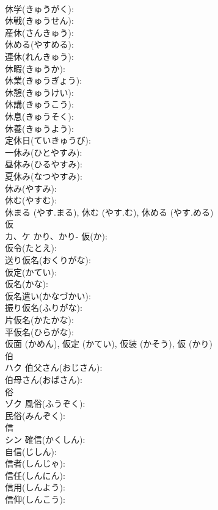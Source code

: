 \documentclass[8pt]{extreport}
\begin{document}
\begin{CJK}{UTF8}{min}
\\	休学(きゅうがく): 
\\	休戦(きゅうせん): 
\\	産休(さんきゅう): 
\\	休める(やすめる): 
\\	連休(れんきゅう): 
\\	休暇(きゅうか): 
\\	休業(きゅうぎょう): 
\\	休憩(きゅうけい): 
\\	休講(きゅうこう): 
\\	休息(きゅうそく): 
\\	休養(きゅうよう): 
\\	定休日(ていきゅうび): 
\\	一休み(ひとやすみ): 
\\	昼休み(ひるやすみ): 
\\	夏休み(なつやすみ): 
\\	休み(やすみ): 
\\	休む(やすむ): 
\\	休まる (やす.まる), 休む (やす.む), 休める (やす.める)
\\	仮			
\\	カ、ケ	かり、かり-	仮(か): 
\\	仮令(たとえ): 
\\	送り仮名(おくりがな): 
\\	仮定(かてい): 
\\	仮名(かな): 
\\	仮名遣い(かなづかい): 
\\	振り仮名(ふりがな): 
\\	片仮名(かたかな): 
\\	平仮名(ひらがな): 
\\	仮面 (かめん), 仮定 (かてい), 仮装 (かそう), 仮 (かり)
\\	伯			
\\	ハク		伯父さん(おじさん): 
\\	伯母さん(おばさん): 
\\	俗			
\\	ゾク		風俗(ふうぞく): 
\\	民俗(みんぞく): 
\\	信			
\\	シン		確信(かくしん): 
\\	自信(じしん): 
\\	信者(しんじゃ): 
\\	信任(しんにん): 
\\	信用(しんよう): 
\\	信仰(しんこう): 

\end{CJK}
\end{document}
